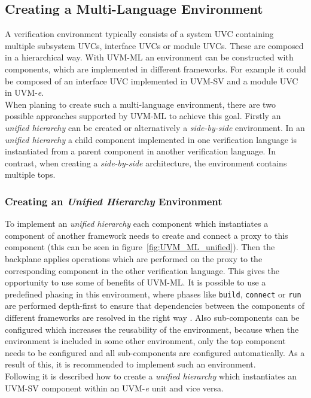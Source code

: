 \subsection{Creating a Multi-Language Environment}
A verification environment typically consists of a system UVC containing
multiple subsystem UVCs, interface UVCs or module UVCs. These are composed in a
hierarchical way. With UVM-ML an environment can be constructed with components,
which are implemented in different frameworks. For example it could be composed
of an interface UVC implemented in UVM-SV and a module UVC in
UVM-\textit{e}. \\
When planing to create such a multi-language environment, there
are two possible approaches supported by UVM-ML to achieve this goal. Firstly an
\emph{unified hierarchy} can be created or alternatively a \emph{side-by-side}
environment. In an \emph{unified hierarchy} a child component implemented in one
verification language is instantiated from a parent component in another
verification language. In contrast, when creating a \emph{side-by-side} architecture,
the environment contains multiple tops.

\subsubsection{Creating an \emph{Unified Hierarchy} Environment}
To implement an \emph{unified hierarchy} each component which instantiates a
component of another framework needs to create and connect a proxy to
this component (this can be seen in figure~\ref{fig:UVM_ML_unified}). Then the
backplane applies operations which are performed on the proxy to the
corresponding component in the other verification language. This gives the
opportunity to use some of benefits of UVM-ML. It is possible to use a predefined
phasing in this environment, where phases like \lstinline$build$, \lstinline$connect$ or \lstinline$run$ are
performed depth-first to ensure that dependencies between the components of
different frameworks are resolved in the right way \cite{uvm_ml_ref}. Also sub-components can be
configured which increases the reusability of the environment, because when the
environment is included in some other environment, only the top component needs
to be configured and all sub-components are configured automatically. As a result of
this, it is recommended to implement such an environment.\\
Following it is described how to create a \emph{unified hierarchy} which
instantiates an UVM-SV component within an UVM-\textit{e} unit and vice versa.

